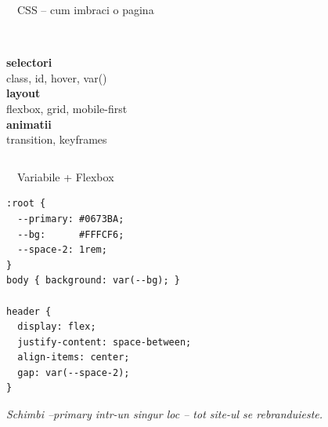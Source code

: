 \documentclass[aspectratio=169,11pt]{beamer}
\newcommand{\code}[1]{{\ttfamily\small\color{accent!85!black}#1}}
\begin{document}
\begin{frame}[c]{\textcolor{themeCss}{\faPaintBrush}\ \ CSS -- cum imbraci o pagina}
  \begin{columns}[T,onlytextwidth]
    \centering
    {\color{themeCss}\fontsize{60}{60}\selectfont\faMousePointer}\\[16pt]
    {\Large\bfseries selectori}\\[4pt]
    {\small\color{textDim}class, id, hover, var()}
    \centering
    {\color{themeCss}\fontsize{60}{60}\selectfont\faThLarge}\\[16pt]
    {\Large\bfseries layout}\\[4pt]
    {\small\color{textDim}flexbox, grid, mobile-first}
    \centering
    {\color{themeCss}\fontsize{60}{60}\selectfont\faMagic}\\[16pt]
    {\Large\bfseries animatii}\\[4pt]
    {\small\color{textDim}transition, keyframes}
  \end{columns}
\end{frame}

\begin{frame}[fragile]{\textcolor{themeCss}{\faPaintBrush}\ \ Variabile + Flexbox}
\vspace{6pt}
\begin{lstlisting}[style=css]
:root {
  --primary: #0673BA;
  --bg:      #FFFCF6;
  --space-2: 1rem;
}
body { background: var(--bg); }

header {
  display: flex;
  justify-content: space-between;
  align-items: center;
  gap: var(--space-2);
}
\end{lstlisting}
\vspace{4pt}
{\footnotesize\color{textDim}\itshape Schimbi \code{--primary} intr-un singur loc -- tot site-ul se rebranduieste.}
\end{frame}
\end{document}

